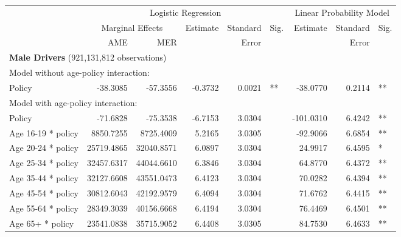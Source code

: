 
\begin{table}%
\centering 
\begin{tabular}{l r r r r l r r l} 

\hline 
 
 & \multicolumn{5}{c}{Logistic Regression}  & \multicolumn{3}{c}{Linear Probability Model} \\ 

 \cmidrule(lr){2-6}\cmidrule(lr){7-9} 
 & \multicolumn{2}{c}{Marginal Effects} & Estimate & Standard & Sig. & Estimate & Standard & Sig. \\ 
 &   AME &  MER  &          &  Error   &      &          &  Error   &     \\ 

\hline 
 
\multicolumn{8}{l}{\textbf{Male Drivers} (921,131,812 observations)} \\ 

\hline
\multicolumn{8}{l}{Model without age-policy interaction: } \\ 
Policy                   &  -38.3085        &  -57.3556       &  -0.3732        &  0.0021       &   **       &  -38.0770        &  0.2114       &   **       \\ 
\hline
\multicolumn{8}{l}{Model with age-policy interaction: } \\ 
Policy                   &  -71.6828        &  -75.3538       &  -6.7153        &  3.0304       &            &  -101.0310        &  6.4242       &   **       \\ 
Age 16-19 * policy   &  8850.7255        &  8725.4009       &  5.2165        &  3.0305       &            &  -92.9066        &  6.6854       &   **       \\ 
Age 20-24 * policy   &  25719.4865        &  32040.8571       &  6.0897        &  3.0304       &            &  24.9917        &  6.4595       &    *       \\ 
Age 25-34 * policy   &  32457.6317        &  44044.6610       &  6.3846        &  3.0304       &            &  64.8770        &  6.4372       &   **       \\ 
Age 35-44 * policy   &  32127.6608        &  43551.0473       &  6.4123        &  3.0304       &            &  70.0282        &  6.4394       &   **       \\ 
Age 45-54 * policy   &  30812.6043        &  42192.9579       &  6.4094        &  3.0304       &            &  71.6762        &  6.4415       &   **       \\ 
Age 55-64 * policy   &  28349.3039        &  40156.6668       &  6.4194        &  3.0304       &            &  76.4469        &  6.4501       &   **       \\ 
Age 65+ * policy   &  23541.0838        &  35715.9052       &  6.4408        &  3.0305       &            &  84.7530        &  6.4633       &   **       \\ 


\end{tabular}
\end{table}
